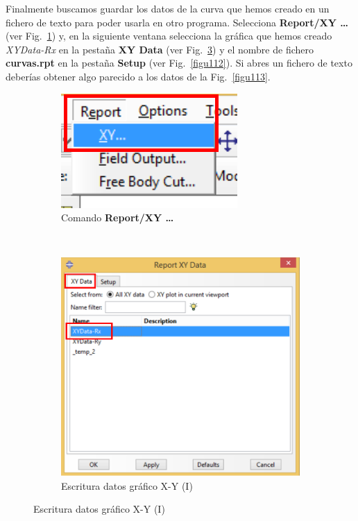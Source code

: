 \begin{enumerate}
Finalmente buscamos guardar los datos de la curva que hemos creado en
un fichero de texto para poder usarla en otro programa. Selecciona
\textbf{Report/XY \ldots} (ver Fig.~\ref{figu110}) y, en la siguiente
ventana selecciona la gráfica que hemos creado \textit{XYData-Rx} en
la pestaña \textbf{XY Data} (ver Fig.~\ref{figu111}) y el nombre de
fichero \textbf{curvas.rpt} en la pestaña \textbf{Setup} (ver
Fig.~\ref{figu112}). Si abres un fichero de texto deberías obtener
algo parecido a los datos de la Fig.~\ref{figu113}.


\begin{figure}[H]
  \centering
  \begin{subfigure}{0.30\textwidth}
    \includegraphics[width=\textwidth]{./body/images/imagen110.pdf}
    \caption{Comando \textbf{Report/XY \ldots}}
    \label{figu110}
  \end{subfigure}%
  ~ %
  \begin{subfigure}{0.50\textwidth}
    \includegraphics[width=\textwidth]{./body/images/imagen111.pdf}
    \caption{Escritura datos gráfico X-Y (I)}
    \label{figu111}
  \end{subfigure}%
  

\end{figure}
\end{enumerate}
